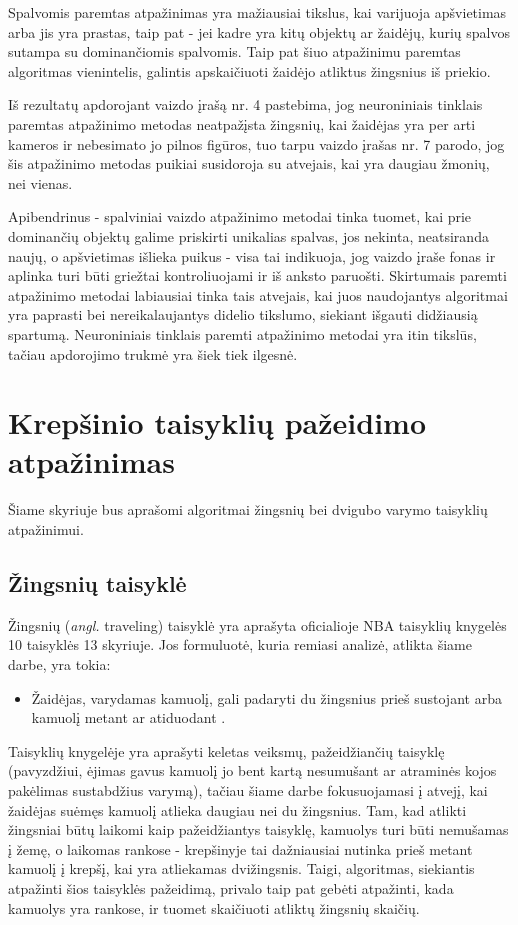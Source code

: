 \documentclass{VUMIFPSbakalaurinis}
\begin{document}
Spalvomis paremtas atpažinimas yra mažiausiai tikslus, kai varijuoja apšvietimas arba jis yra prastas, taip pat - jei kadre yra kitų objektų ar žaidėjų, kurių spalvos sutampa su dominančiomis spalvomis. Taip pat šiuo atpažinimu paremtas algoritmas vienintelis, galintis apskaičiuoti žaidėjo atliktus žingsnius iš priekio. 

Iš rezultatų apdorojant vaizdo įrašą nr. 4 pastebima, jog neuroniniais tinklais paremtas atpažinimo metodas neatpažįsta žingsnių, kai žaidėjas yra per arti kameros ir nebesimato jo pilnos figūros, tuo tarpu vaizdo įrašas nr. 7 parodo, jog šis atpažinimo metodas puikiai susidoroja su atvejais, kai yra daugiau žmonių, nei vienas. 

Apibendrinus - spalviniai vaizdo atpažinimo metodai tinka tuomet, kai prie dominančių objektų galime priskirti unikalias spalvas, jos nekinta, neatsiranda naujų, o apšvietimas išlieka puikus - visa tai indikuoja, jog vaizdo įraše fonas ir aplinka turi būti griežtai kontroliuojami ir iš anksto paruošti. Skirtumais paremti atpažinimo metodai labiausiai tinka tais atvejais, kai juos naudojantys algoritmai yra paprasti bei nereikalaujantys didelio tikslumo, siekiant išgauti didžiausią spartumą. Neuroniniais tinklais paremti atpažinimo metodai yra itin tikslūs, tačiau apdorojimo trukmė yra šiek tiek ilgesnė.

\section{Krepšinio taisyklių pažeidimo atpažinimas}

Šiame skyriuje bus aprašomi algoritmai žingsnių bei dvigubo varymo taisyklių atpažinimui.

\subsection{Žingsnių taisyklė}
Žingsnių (\textit{angl.} traveling) taisyklė yra aprašyta oficialioje NBA taisyklių knygelės 10 taisyklės 13 skyriuje. Jos formuluotė, kuria remiasi analizė, atlikta šiame darbe, yra tokia: 

\begin{itemize}
	\item Žaidėjas, varydamas kamuolį, gali padaryti du žingsnius prieš sustojant arba kamuolį metant ar atiduodant \cite{nba-rules}. 
\end{itemize}

Taisyklių knygelėje yra aprašyti keletas veiksmų, pažeidžiančių taisyklę (pavyzdžiui, ėjimas gavus kamuolį jo bent kartą nesumušant ar atraminės kojos pakėlimas sustabdžius varymą), tačiau šiame darbe fokusuojamasi į atvejį, kai žaidėjas suėmęs kamuolį atlieka daugiau nei du žingsnius. Tam, kad atlikti žingsniai būtų laikomi kaip pažeidžiantys taisyklę, kamuolys turi būti nemušamas į žemę, o laikomas rankose - krepšinyje tai dažniausiai nutinka prieš metant kamuolį į krepšį, kai yra atliekamas dvižingsnis. Taigi, algoritmas, siekiantis atpažinti šios taisyklės pažeidimą, privalo taip pat gebėti atpažinti, kada kamuolys yra rankose, ir tuomet skaičiuoti atliktų žingsnių skaičių. 
\end{document}
